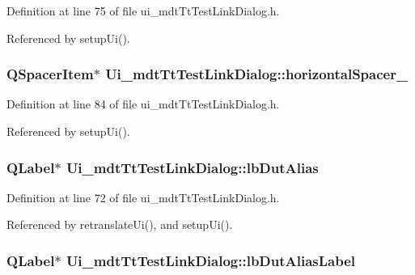 Definition at line 75 of file ui\-\_\-mdt\-Tt\-Test\-Link\-Dialog.\-h.



Referenced by setup\-Ui().

\hypertarget{class_ui__mdt_tt_test_link_dialog_a4b88459f0a5db8db737335086a104cee}{
\subsubsection[{horizontal\-Spacer\-\_\-4}]{\setlength{\rightskip}{0pt plus 5cm}Q\-Spacer\-Item$\ast$ Ui\-\_\-mdt\-Tt\-Test\-Link\-Dialog\-::horizontal\-Spacer\-\_}}\label{class_ui__mdt_tt_test_link_dialog_a4b88459f0a5db8db737335086a104cee}


Definition at line 84 of file ui\-\_\-mdt\-Tt\-Test\-Link\-Dialog.\-h.



Referenced by setup\-Ui().

\hypertarget{class_ui__mdt_tt_test_link_dialog_ae850af93e6ed662dc9bf680e40d67d03}{
\subsubsection[{lb\-Dut\-Alias}]{\setlength{\rightskip}{0pt plus 5cm}Q\-Label$\ast$ Ui\-\_\-mdt\-Tt\-Test\-Link\-Dialog\-::lb\-Dut\-Alias}}\label{class_ui__mdt_tt_test_link_dialog_ae850af93e6ed662dc9bf680e40d67d03}


Definition at line 72 of file ui\-\_\-mdt\-Tt\-Test\-Link\-Dialog.\-h.



Referenced by retranslate\-Ui(), and setup\-Ui().

\hypertarget{class_ui__mdt_tt_test_link_dialog_a53bb504fb37cb3c138169d24a22562c8}{
\subsubsection[{lb\-Dut\-Alias\-Label}]{\setlength{\rightskip}{0pt plus 5cm}Q\-Label$\ast$ Ui\-\_\-mdt\-Tt\-Test\-Link\-Dialog\-::lb\-Dut\-Alias\-Label}}\label{class_ui__mdt_tt_test_link_dialog_a53bb504fb37cb3c138169d24a22562c8}


